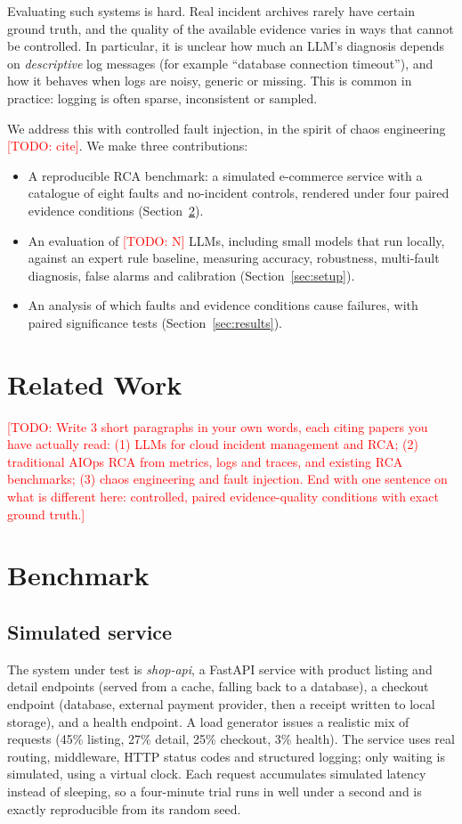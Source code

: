 \documentclass[conference]{IEEEtran}
\newcommand{\TODO}[1]{\textcolor{red}{[TODO: #1]}}
\begin{document}
Evaluating such systems is hard. Real incident archives rarely have certain ground truth, and the quality of the available evidence varies in ways that cannot be controlled. In particular, it is unclear how much an LLM's diagnosis depends on \emph{descriptive} log messages (for example ``database connection timeout''), and how it behaves when logs are noisy, generic or missing. This is common in practice: logging is often sparse, inconsistent or sampled.

We address this with controlled fault injection, in the spirit of chaos engineering \TODO{cite}. We make three contributions:
\begin{itemize}
  \item A reproducible RCA benchmark: a simulated e-commerce service with a catalogue of eight faults and no-incident controls, rendered under four paired evidence conditions (Section~\ref{sec:bench}).
  \item An evaluation of \TODO{N} LLMs, including small models that run locally, against an expert rule baseline, measuring accuracy, robustness, multi-fault diagnosis, false alarms and calibration (Section~\ref{sec:setup}).
  \item An analysis of which faults and evidence conditions cause failures, with paired significance tests (Section~\ref{sec:results}).
\end{itemize}

\section{Related Work}
\TODO{Write 3 short paragraphs in your own words, each citing papers you have actually read:
(1) LLMs for cloud incident management and RCA;
(2) traditional AIOps RCA from metrics, logs and traces, and existing RCA benchmarks;
(3) chaos engineering and fault injection.
End with one sentence on what is different here: controlled, paired evidence-quality conditions with exact ground truth.}

\section{Benchmark}
\label{sec:bench}
\subsection{Simulated service}
The system under test is \emph{shop-api}, a FastAPI service with product listing and detail endpoints (served from a cache, falling back to a database), a checkout endpoint (database, external payment provider, then a receipt written to local storage), and a health endpoint. A load generator issues a realistic mix of requests (45\% listing, 27\% detail, 25\% checkout, 3\% health). The service uses real routing, middleware, HTTP status codes and structured logging; only waiting is simulated, using a virtual clock. Each request accumulates simulated latency instead of sleeping, so a four-minute trial runs in well under a second and is exactly reproducible from its random seed.
\end{document}
